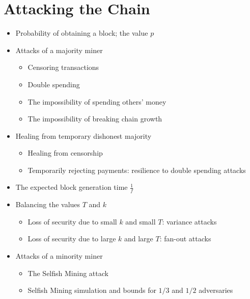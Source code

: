 \chapter{Attacking the Chain}

{\color{red}
\begin{itemize}
\item Probability of obtaining a block; the value $p$
\item Attacks of a majority miner
    \begin{itemize}
    \item Censoring transactions
    \item Double spending
    \item The impossibility of spending others' money
    \item The impossibility of breaking chain growth
    \end{itemize}
\item Healing from temporary dishonest majority
    \begin{itemize}
    \item Healing from censorship
    \item Temporarily rejecting payments: resilience to double spending attacks
    \end{itemize}
\item The expected block generation time $\frac{1}{f}$
\item Balancing the values $T$ and $k$
    \begin{itemize}
    \item Loss of security due to small $k$ and small $T$: variance attacks
    \item Loss of security due to large $k$ and large $T$: fan-out attacks
    \end{itemize}

\item Attacks of a minority miner
    \begin{itemize}
    \item The Selfish Mining attack
    \item Selfish Mining simulation and bounds for $1/3$ and $1/2$ adversaries
    \end{itemize}
\end{itemize}
}
